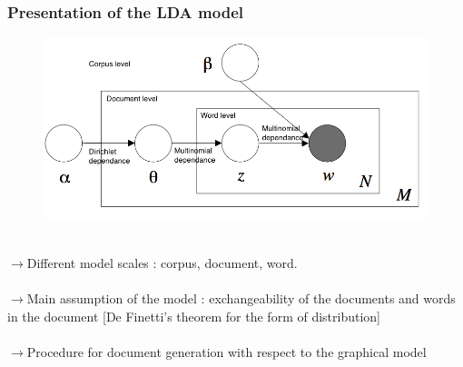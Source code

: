 \documentclass{beamer}
\begin{document}
\begin{frame}
\frametitle{Presentation of the LDA model}
\begin{figure}
\includegraphics[width=18cm]{LDA}~\\
\end{figure}

$\rightarrow$Different model scales : corpus, document, word.~\\
~\\
$\rightarrow$Main assumption of the model : exchangeability of the documents and words in the document [De Finetti's theorem for the form of distribution]~\\
~\\
$\rightarrow$Procedure for document generation with respect to the graphical model~\\

\end{frame}
\end{document}

